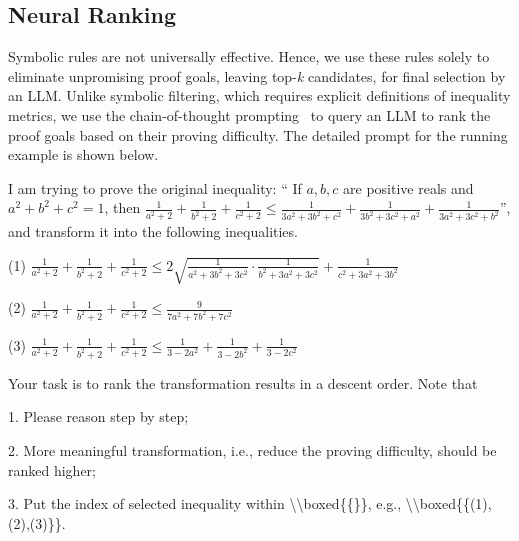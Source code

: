 \vspace{-0.3em}
\subsection{Neural Ranking}
\vspace{-0.3em}
Symbolic rules are not universally effective. Hence, we use these rules solely to eliminate unpromising proof goals, leaving top-\textit{k} candidates, for final selection by an LLM. Unlike symbolic filtering, which requires explicit definitions of inequality metrics, we use the chain-of-thought prompting~\citep{wei2022chain, chu2023survey} to query an LLM to rank the proof goals based on their proving difficulty. The detailed prompt for the running example is shown below.

             
{\small
\begin{tcolorbox}[colframe=black!75!white, colback=gray!10!white, boxsep=2.5pt, top=5pt, bottom=5pt, left=5pt, right=5pt, title={Prompt of neural ranking}]  
I am trying to prove the original inequality:
``
If $a, b, c$ are positive reals and $a^2 + b^2 + c^2 = 1$, then
$\frac{1}{a^2+2}+\frac{1}{b^2+2}+\frac{1}{c^2+2} \leq \frac{1}{3a^2+3b^2+c^2}+\frac{1}{3b^2+3c^2+a^2}+\frac{1}{3a^2+3c^2+b^2}
$'',
and transform it into the following inequalities.

(1) $\frac{1}{a ^ 2 + 2} + \frac{1}{b ^ 2 + 2} + \frac{1}{c^2 + 2} \leq  2 \sqrt{\frac{1}{a ^ 2 + 3b ^ 2 + 3c ^ 2} \cdot \frac{1}{b ^ 2 + 3a ^ 2 + 3c ^ 2}} + \frac{1}{c^2 + 3a^2 + 3b^2}$

(2) $\frac{1}{a ^ 2 + 2} + \frac{1}{b ^ 2 + 2} + \frac{1}{c^2 + 2} \leq \frac{9}{7a ^ 2 + 7 b ^ 2 + 7 c ^ 2}$

(3) $\frac{1}{a ^ 2 + 2} + \frac{1}{b ^ 2 + 2} + \frac{1}{c^2 + 2} \leq \frac{1}{3 - 2a ^ 2} + \frac{1}{3 - 2b ^ 2} + \frac{1}{3 - 2c ^ 2}$

\vskip 3pt

Your task is to rank the transformation results in a descent order. Note that

1. Please reason step by step; 

2. More meaningful transformation, i.e., reduce the proving difficulty, should be ranked higher; 

3. Put the index of selected inequality within \textbackslash\textbackslash boxed\{\{\}\}, e.g., \textbackslash\textbackslash boxed\{\{(1),(2),(3)\}\}.
\end{tcolorbox}
}

